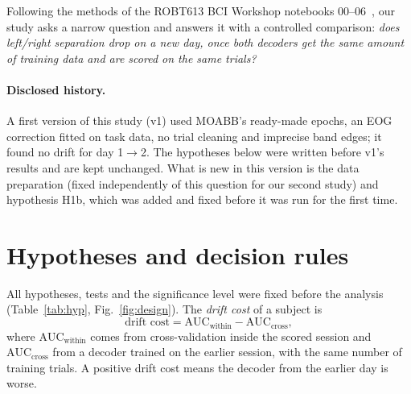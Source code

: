 \documentclass[11pt,a4paper]{article}
\newcommand{\arr}{$\rightarrow$}
\begin{document}
Following the methods of the ROBT613 BCI Workshop notebooks 00--06~\cite{workshop}, our study asks a narrow question and answers it with a controlled comparison: \emph{does left/right separation drop on a
new day, once both decoders get the same amount of training data and are scored on the same trials?}

\paragraph{Disclosed history.} A first version of this study (v1) used MOABB's ready-made epochs, an EOG correction fitted
on task data, no trial cleaning and imprecise band edges; it found no drift for day 1\arr2. The hypotheses below were
written before v1's results and are kept unchanged. What is new in this version is the data preparation (fixed
independently of this question for our second study) and hypothesis H1b, which was added and fixed before it was run
for the first time.

\section{Hypotheses and decision rules}
All hypotheses, tests and the significance level were fixed before the analysis (Table~\ref{tab:hyp}, Fig.~\ref{fig:design}).
The \emph{drift cost} of a subject is
\begin{equation}
  \text{drift cost} = \text{AUC}_\text{within} - \text{AUC}_\text{cross},
\end{equation}
where $\text{AUC}_\text{within}$ comes from cross-validation inside the scored session and
$\text{AUC}_\text{cross}$ from a decoder trained on the earlier session, with the same number of training trials.
A positive drift cost means the decoder from the earlier day is worse.
\end{document}
